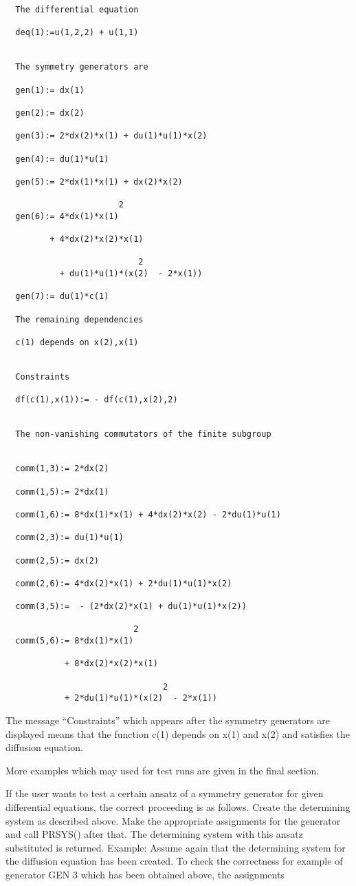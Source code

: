 \begin{verbatim}
  The differential equation

  deq(1):=u(1,2,2) + u(1,1)


  The symmetry generators are

  gen(1):= dx(1)

  gen(2):= dx(2)

  gen(3):= 2*dx(2)*x(1) + du(1)*u(1)*x(2)

  gen(4):= du(1)*u(1)

  gen(5):= 2*dx(1)*x(1) + dx(2)*x(2)

                       2
  gen(6):= 4*dx(1)*x(1)

         + 4*dx(2)*x(2)*x(1)

                           2
           + du(1)*u(1)*(x(2)  - 2*x(1))

  gen(7):= du(1)*c(1)

  The remaining dependencies

  c(1) depends on x(2),x(1)


  Constraints

  df(c(1),x(1)):= - df(c(1),x(2),2)


  The non-vanishing commutators of the finite subgroup


  comm(1,3):= 2*dx(2)

  comm(1,5):= 2*dx(1)

  comm(1,6):= 8*dx(1)*x(1) + 4*dx(2)*x(2) - 2*du(1)*u(1)

  comm(2,3):= du(1)*u(1)

  comm(2,5):= dx(2)

  comm(2,6):= 4*dx(2)*x(1) + 2*du(1)*u(1)*x(2)

  comm(3,5):=  - (2*dx(2)*x(1) + du(1)*u(1)*x(2))

                          2
  comm(5,6):= 8*dx(1)*x(1)

            + 8*dx(2)*x(2)*x(1)

                                2
            + 2*du(1)*u(1)*(x(2)  - 2*x(1))
\end{verbatim}

The message ``Constraints'' which appears after the symmetry generators
are displayed means that the function c(1) depends on x(1) and x(2)
and satisfies the diffusion equation.

More examples which may used for test runs are given in the final
section.

If the user wants to test a certain ansatz of a symmetry generator for
given differential equations, the correct proceeding is as follows.
Create the determining system as described above. Make the appropriate
assignments for the generator and call PRSYS() after that.  The
determining system with this ansatz substituted is returned.  Example:
Assume again that the determining system for the diffusion equation
has been created. To check the correctness for example of generator GEN
3 which has been obtained above, the assignments

